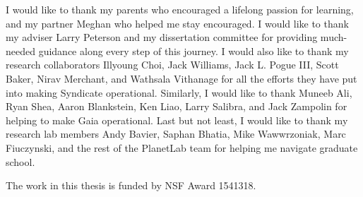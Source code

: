 I would like to thank my parents who encouraged a lifelong passion for learning,
and my partner Meghan who helped me stay encouraged.
I would like to thank my adviser Larry Peterson and my dissertation
committee for providing much-needed guidance along every step of this journey.
I would also like to thank my research collaborators Illyoung Choi, Jack Williams,
Jack L. Pogue III, Scott Baker, Nirav Merchant, and Wathsala Vithanage for all the efforts they have
put into making Syndicate operational.  Similarly, I would like to thank Muneeb
Ali, Ryan Shea, Aaron Blankstein, Ken Liao, Larry Salibra, and Jack Zampolin for
helping to make Gaia operational.  Last but not least,
I would like to thank my research lab members Andy Bavier, Saphan Bhatia, Mike
Wawwrzoniak, Marc Fiuczynski, and the rest of the PlanetLab team for helping me
navigate graduate school.

The work in this thesis is funded by NSF Award 1541318.
